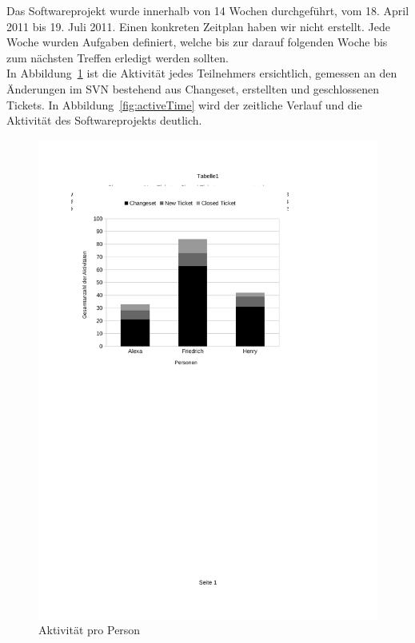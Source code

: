 Das Softwareprojekt wurde innerhalb von 14 Wochen durchgeführt, vom 18. April 2011 bis 19. Juli 2011. Einen konkreten Zeitplan haben wir nicht erstellt. Jede Woche wurden Aufgaben definiert, welche bis zur darauf folgenden Woche \bzw bis zum nächsten Treffen erledigt werden sollten.\\

In Abbildung~\ref{fig:activePP} ist die Aktivität jedes Teilnehmers ersichtlich, gemessen an den Änderungen im SVN bestehend aus Changeset, erstellten und geschlossenen Tickets. In Abbildung~\ref{fig:activeTime} wird der zeitliche Verlauf und die Aktivität des Softwareprojekts deutlich.

\begin{figure}[htbp]
\centering
\includegraphics{03_pics/stat1.pdf}
\caption{Aktivität pro Person}
\label{fig:activePP}
\end{figure}

